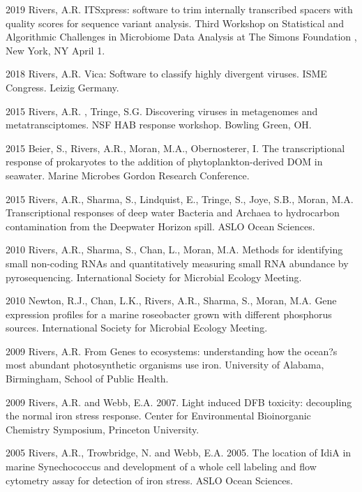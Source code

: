 \documentclass[12pt,letterpaper]{report}
\begin{document}
    \begin{tablist}
    	
\item[2019 ] \tab Rivers, A.R. ITSxpress: software to trim internally transcribed spacers with quality scores for sequence variant analysis. Third Workshop on Statistical and Algorithmic Challenges in Microbiome Data Analysis at The Simons Foundation , New York, NY April 1. 

\item[2018 ] \tab Rivers, A.R. Vica: Software to classify highly divergent viruses. ISME Congress. Leizig Germany.

\item[2015 ] \tab Rivers, A.R. , Tringe, S.G. Discovering viruses in metagenomes and metatransciptomes. NSF HAB response workshop. Bowling Green, OH.

\item[2015 ] \tab  Beier, S., Rivers, A.R., Moran, M.A., Obernosterer, I. The transcriptional response of prokaryotes to the addition of phytoplankton-derived DOM in seawater. Marine Microbes Gordon Research Conference. 

\item[2015] \tab Rivers, A.R., Sharma, S., Lindquist, E., Tringe, S., Joye, S.B., Moran, M.A.  Transcriptional responses of deep water Bacteria and Archaea to hydrocarbon contamination from the Deepwater Horizon spill. ASLO Ocean Sciences. 

\item[2010] \tab Rivers, A.R., Sharma, S., Chan, L., Moran, M.A. Methods for identifying small non-coding RNAs and quantitatively measuring small RNA abundance by pyrosequencing. International Society for Microbial Ecology Meeting.

\item[2010] \tab Newton, R.J., Chan, L.K., Rivers, A.R., Sharma, S., Moran, M.A.  Gene expression profiles for a marine roseobacter grown with different phosphorus sources. International Society for Microbial Ecology Meeting.

\item[2009] \tab Rivers, A.R. From Genes to ecosystems: understanding how the ocean?s most abundant photosynthetic organisms use iron. University of Alabama, Birmingham, School of Public Health.

\item[2009] \tab Rivers, A.R. and Webb, E.A. 2007. Light induced DFB toxicity: decoupling the normal iron stress response. Center for Environmental Bioinorganic Chemistry Symposium, Princeton University. 

\item[2005] \tab Rivers, A.R., Trowbridge, N. and Webb, E.A. 2005. The location of IdiA in marine Synechococcus and development of a whole cell labeling and flow cytometry assay for detection of iron stress. ASLO Ocean Sciences.

		

    \end{tablist}
\end{document}
